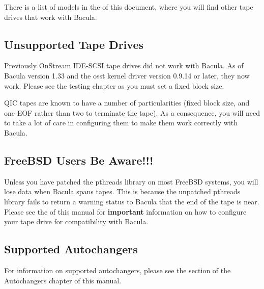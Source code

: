 There is a list of 
 models in the 
 of this document,
where you will find other tape drives that work with Bacula. 

\subsection*{Unsupported Tape Drives}
\label{UnSupportedDrives}

Previously OnStream IDE-SCSI tape drives did not work with Bacula. As of
Bacula version 1.33 and the osst kernel driver version 0.9.14 or later, they
now work. Please see the testing chapter as you must set a fixed block size. 

QIC tapes are known to have a number of particularities (fixed block size, and
one EOF rather than two to terminate the tape). As a consequence, you will
need to take a lot of care in configuring them to make them work correctly
with Bacula. 

\subsection*{FreeBSD Users Be Aware!!!}

Unless you have patched the pthreads library on most FreeBSD systems, you will
lose data when Bacula spans tapes. This is because the unpatched pthreads
library fails to return a warning status to Bacula that the end of the tape is
near. Please see the 
 of this manual for
{\bf important} information on how to configure your tape drive for
compatibility with Bacula. 

\subsection*{Supported Autochangers}

For information on supported autochangers, please see the 
section of the Autochangers chapter of this manual. 
